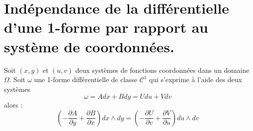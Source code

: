 \section{Indépendance de la différentielle d'une 1-forme par rapport au système de coordonnées.}
\begin{thm}
 Soit $(x,y)$ et $(u,v)$ deux systèmes de fonctions coordonnées dans un domaine $\Omega$. Soit $\omega$ une 1-forme différentielle de classe $\mathcal C^1$ qui s'exprime à l'aide des deux systèmes
\begin{displaymath}
 \omega = Adx+Bdy = Udu + Vdv
\end{displaymath}
alors :
\begin{displaymath}
 \left(
-\frac{\partial A}{\partial y}+\frac{\partial B}{\partial x}
 \right) dx\wedge dy 
=
  \left(
-\frac{\partial U}{\partial v}+\frac{\partial V}{\partial u}
 \right) du\wedge dv
\end{displaymath}
\end{thm}
